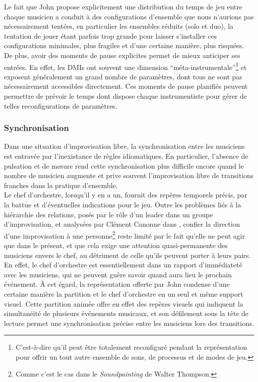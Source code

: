 \noindent Le fait que John propose explicitement une distribution du temps de jeu entre chaque musicien a conduit à des configurations d'ensemble que nous n'aurions pas nécessairement tentées, en particulier les ensembles réduits (solo et duo), la tentation de jouer étant parfois trop grande pour laisser s'installer ces configurations minimales, plus fragiles et d'une certaine manière, plus risquées.\\
\indent De plus, avoir des moments de pause explicites permet de mieux anticiper ses entrées. En effet, les \glspl{DMI} ont souvent une dimension ``méta-instrumentale''\footnote{C'est-à-dire qu'il peut être totalement reconfiguré pendant la représentation pour offrir un tout autre ensemble de sons, de processus et de modes de jeu.} et exposent généralement un grand nombre de paramètres, dont tous ne sont pas nécessairement accessibles directement. Ces moments de pause planifiés peuvent permettre de prévoir le temps dont dispose chaque instrumentiste pour gérer de telles reconfigurations de paramètres.

\subsubsection{Synchronisation}

\noindent Dans une situation d'improvisation libre, la synchronisation entre les musiciens est entravée par l'inexistance de règles idiomatiques. En particulier, l'absence de pulsation et de mesure rend cette synchronisation plus difficile encore quand le nombre de musicien augmente et prive souvent l'improvisation libre de transitions franches dans la pratique d'ensemble.\\
\indent Le chef d'orchestre, lorsqu'il y en a un, fournit des repères temporels précis, par la battue et d'éventuelles indications pour le jeu. Outre les problèmes liés à la hiérarchie des relations, posés par le rôle d'un leader dans un groupe d'improvisation, et analysées par Clément Canonne dans \cite{canonne_improvisation_2012}, confier la direction d'une improvisation à une personne\footnote{Comme c'est le cas dans le \textit{Soundpainting} de Walter Thompson.} reste limité par le fait qu'elle ne peut agir que dans le présent, et que cela exige une attention quasi-permanente des musiciens envers le chef, au détriment de celle qu'ils peuvent porter à leurs pairs. En effet, le chef d'orchestre est essentiellement dans un rapport d'immédiateté avec les musiciens, qui ne peuvent guère savoir quand aura lieu le prochain événement. À cet égard, la représentation offerte par John condense d'une certaine manière la partition et le chef d'orchestre en un seul et même support visuel. Cette partition animée offre en effet des repères visuels qui indiquent la simultanéité de plusieurs événements musicaux, et son défilement sous la tête de lecture permet une synchronisation précise entre les musiciens lors des transitions.


